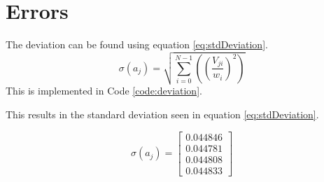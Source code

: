 \section{Errors}
The deviation can be found using equation \ref{eq:stdDeviation}.
\[
\sigma\left(a_j\right) = \sqrt{ \sum_{i=0}^{N-1} \left( \left( \frac{V_{ji}}{w_i}\right)^2\right) }
\label{eq:stdDeviation}
\]
This is implemented in Code \ref{code:deviation}.


This results in the standard deviation seen in equation \ref{eq:stdDeviation}.

\begin{equation}
\sigma\left(a_j\right) = 
\left[
\begin{array}{c}
 0.044846 \\
 0.044781 \\
 0.044808 \\
 0.044833
\end{array}
\right]
\label{eq:stdDeviation}
\end{equation}